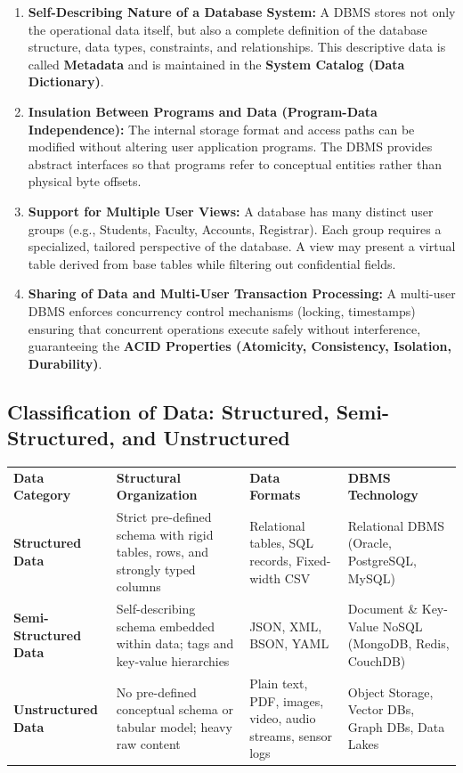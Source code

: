 \documentclass[11pt,a4paper]{article}
\begin{document}
\begin{enumerate}
  \item \textbf{Self-Describing Nature of a Database System:}
    A DBMS stores not only the operational data itself, but also a complete definition of the database structure, data types, constraints, and relationships. This descriptive data is called \textbf{Metadata} and is maintained in the \textbf{System Catalog (Data Dictionary)}.
  \item \textbf{Insulation Between Programs and Data (Program-Data Independence):}
    The internal storage format and access paths can be modified without altering user application programs. The DBMS provides abstract interfaces so that programs refer to conceptual entities rather than physical byte offsets.
  \item \textbf{Support for Multiple User Views:}
    A database has many distinct user groups (e.g., Students, Faculty, Accounts, Registrar). Each group requires a specialized, tailored perspective of the database. A view may present a virtual table derived from base tables while filtering out confidential fields.
  \item \textbf{Sharing of Data and Multi-User Transaction Processing:}
    A multi-user DBMS enforces concurrency control mechanisms (locking, timestamps) ensuring that concurrent operations execute safely without interference, guaranteeing the \textbf{ACID Properties (Atomicity, Consistency, Isolation, Durability)}.
\end{enumerate}

\subsection{Classification of Data: Structured, Semi-Structured, and Unstructured}

\begin{center}
\small
\begin{tabularx}{\textwidth}{L{2.5cm} L{3.8cm} L{3.5cm} X}
  \color{white}\textbf{Data Category} & \color{white}\textbf{Structural Organization} & \color{white}\textbf{Data Formats} & \color{white}\textbf{DBMS Technology} \\
   \textbf{Structured Data} & Strict pre-defined schema with rigid tables, rows, and strongly typed columns & Relational tables, SQL records, Fixed-width CSV & Relational DBMS (Oracle, PostgreSQL, MySQL) \\
  \textbf{Semi-Structured Data} & Self-describing schema embedded within data; tags and key-value hierarchies & JSON, XML, BSON, YAML & Document \& Key-Value NoSQL (MongoDB, Redis, CouchDB) \\
   \textbf{Unstructured Data} & No pre-defined conceptual schema or tabular model; heavy raw content & Plain text, PDF, images, video, audio streams, sensor logs & Object Storage, Vector DBs, Graph DBs, Data Lakes \\
\end{tabularx}
\end{center}
\end{document}
